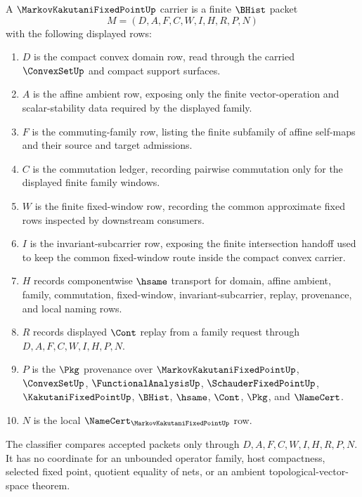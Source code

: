 \begin{definition}\label{def:markov-kakutani-fixed-point-carrier}
A $\MarkovKakutaniFixedPointUp$ carrier is a finite $\BHist$ packet
$$
M=(D,A,F,C,W,I,H,R,P,N)
$$
with the following displayed rows:
\begin{enumerate}
\item $D$ is the compact convex domain row, read through the carried $\ConvexSetUp$ and compact support surfaces.
\item $A$ is the affine ambient row, exposing only the finite vector-operation and scalar-stability data required by the displayed family.
\item $F$ is the commuting-family row, listing the finite subfamily of affine self-maps and their source and target admissions.
\item $C$ is the commutation ledger, recording pairwise commutation only for the displayed finite family windows.
\item $W$ is the finite fixed-window row, recording the common approximate fixed rows inspected by downstream consumers.
\item $I$ is the invariant-subcarrier row, exposing the finite intersection handoff used to keep the common fixed-window route inside the compact convex carrier.
\item $H$ records componentwise $\hsame$ transport for domain, affine ambient, family, commutation, fixed-window, invariant-subcarrier, replay, provenance, and local naming rows.
\item $R$ records displayed $\Cont$ replay from a family request through $D,A,F,C,W,I,H,P,N$.
\item $P$ is the $\Pkg$ provenance over $\MarkovKakutaniFixedPointUp$, $\ConvexSetUp$, $\FunctionalAnalysisUp$, $\SchauderFixedPointUp$, $\KakutaniFixedPointUp$, $\BHist$, $\hsame$, $\Cont$, $\Pkg$, and $\NameCert$.
\item $N$ is the local $\NameCert_{\MarkovKakutaniFixedPointUp}$ row.
\end{enumerate}
The classifier compares accepted packets only through $D,A,F,C,W,I,H,R,P,N$. It has no coordinate for an unbounded operator family, host compactness, selected fixed point, quotient equality of nets, or an ambient topological-vector-space theorem.
\end{definition}

